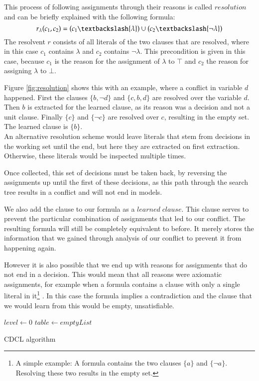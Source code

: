 This process of following assignments through their reasons is called $resolution$ and can be briefly explained with the following formula:
$$
r_\lambda(c_1,c_2) = (c_1 \textbackslash \{\lambda\}) \cup (c_2 \textbackslash \{\neg \lambda\})
$$
The resolvent $r$ consists of all literals of the two clauses that are resolved, where in this case $c_1$ contains $\lambda$ and $c_2$ contains $\neg \lambda$. This precondition is given in this case, because $c_1$ is the reason for the assignment of $\lambda$ to $\top$ and $c_2$ the reason for assigning $\lambda$ to $\bot$. 

Figure \ref{fig:resolution} shows this with an example, where a conflict in variable $d$ happened. First the clauses $\{b,\neg d\}$ and $\{c,b,d\}$ are resolved over the variable $d$. Then $b$ is extracted for the learned clause, as its reason was a decision and not a unit clause. Finally $\{c\}$ and $\{\neg c\}$ are resolved over $c$, resulting in the empty set. The learned clause is $\{b\}$.\\
An alternative resolution scheme would leave literals that stem from decisions in the working set until the end, but here they are extracted on first extraction. Otherwise, these literals would be inspected multiple times.


Once collected, this set of decisions must be taken back, by reversing the assignments up until the first of these decisions, as this path through the search tree results in a conflict and will not end in models. 

We also add the clause to our formula as a $learned\; clause$. This clause serves to prevent the particular combination of assignments that led to our conflict. The resulting formula will still be completely equivalent to before. It merely stores the information that we gained through analysis of our conflict to prevent it from happening again.

However it is also possible that we end up with reasons for assignments that do not end in a decision. This would mean that all reasons were axiomatic assignments, for example when a formula contains a clause with only a single literal in it\footnote{A simple example: A formula contains the two clauses $\{a\}$ and $\{\neg a\}$. Resolving these two results in the empty set.}  .
In this case the formula implies a contradiction and the clause that we would learn from this would be empty, unsatisfiable.


\begin{algorithm}
\DontPrintSemicolon
{}
$level \gets 0$\;
$table \gets emptyList$\;
\caption{{\sc CDCL algorithm}}
\end{algorithm}

